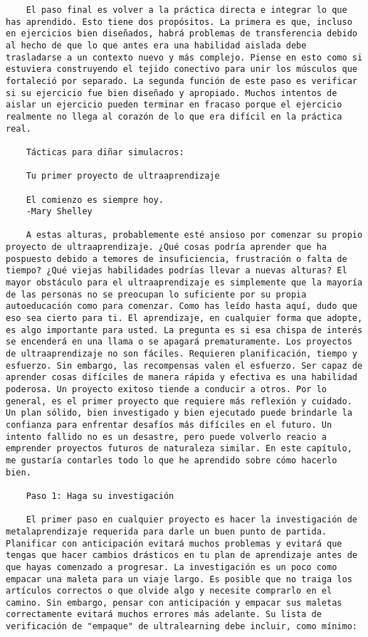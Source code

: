 \begin{verbatim}
	El paso final es volver a la práctica directa e integrar lo que has aprendido. Esto tiene dos propósitos. La primera es que, incluso en ejercicios bien diseñados, habrá problemas de transferencia debido al hecho de que lo que antes era una habilidad aislada debe trasladarse a un contexto nuevo y más complejo. Piense en esto como si estuviera construyendo el tejido conectivo para unir los músculos que fortaleció por separado. La segunda función de este paso es verificar si su ejercicio fue bien diseñado y apropiado. Muchos intentos de aislar un ejercicio pueden terminar en fracaso porque el ejercicio realmente no llega al corazón de lo que era difícil en la práctica real. 
	
	Tácticas para diñar simulacros: 
	
	Tu primer proyecto de ultraaprendizaje
	
	El comienzo es siempre hoy.
	-Mary Shelley
	
	A estas alturas, probablemente esté ansioso por comenzar su propio proyecto de ultraaprendizaje. ¿Qué cosas podría aprender que ha pospuesto debido a temores de insuficiencia, frustración o falta de tiempo? ¿Qué viejas habilidades podrías llevar a nuevas alturas? El mayor obstáculo para el ultraaprendizaje es simplemente que la mayoría de las personas no se preocupan lo suficiente por su propia autoeducación como para comenzar. Como has leído hasta aquí, dudo que eso sea cierto para ti. El aprendizaje, en cualquier forma que adopte, es algo importante para usted. La pregunta es si esa chispa de interés se encenderá en una llama o se apagará prematuramente. Los proyectos de ultraaprendizaje no son fáciles. Requieren planificación, tiempo y esfuerzo. Sin embargo, las recompensas valen el esfuerzo. Ser capaz de aprender cosas difíciles de manera rápida y efectiva es una habilidad poderosa. Un proyecto exitoso tiende a conducir a otros. Por lo general, es el primer proyecto que requiere más reflexión y cuidado. Un plan sólido, bien investigado y bien ejecutado puede brindarle la confianza para enfrentar desafíos más difíciles en el futuro. Un intento fallido no es un desastre, pero puede volverlo reacio a emprender proyectos futuros de naturaleza similar. En este capítulo, me gustaría contarles todo lo que he aprendido sobre cómo hacerlo bien.
	
	Paso 1: Haga su investigación
	
	El primer paso en cualquier proyecto es hacer la investigación de metalaprendizaje requerida para darle un buen punto de partida. Planificar con anticipación evitará muchos problemas y evitará que tengas que hacer cambios drásticos en tu plan de aprendizaje antes de que hayas comenzado a progresar. La investigación es un poco como empacar una maleta para un viaje largo. Es posible que no traiga los artículos correctos o que olvide algo y necesite comprarlo en el camino. Sin embargo, pensar con anticipación y empacar sus maletas correctamente evitará muchos errores más adelante. Su lista de verificación de "empaque" de ultralearning debe incluir, como mínimo:
	

\end{verbatim}
